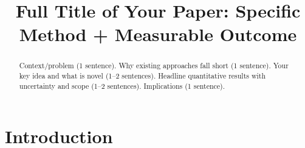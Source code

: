 \documentclass[acmsmall,screen,review,anonymous]{acmart}
\theoremstyle{plain}
\theoremstyle{definition}
\theoremstyle{remark}
\begin{document}
\title[Short Title]{Full Title of Your Paper: Specific Method + Measurable Outcome}



\begin{abstract}
Context/problem (1 sentence). Why existing approaches fall short (1 sentence).
Your key idea and what is novel (1--2 sentences). Headline quantitative
results with uncertainty and scope (1--2 sentences). Implications (1 sentence).
\end{abstract}


\maketitle
\setcounter{footnote}{0} %

\section{Introduction}
\end{document}
